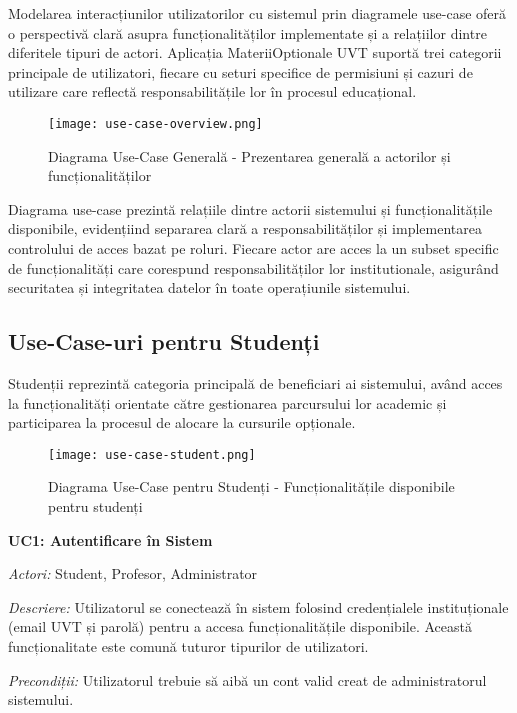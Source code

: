 \documentclass[12pt,a4paper]{report}
\begin{document}
Modelarea interacțiunilor utilizatorilor cu sistemul prin diagramele use-case oferă o perspectivă clară asupra funcționalităților implementate și a relațiilor dintre diferitele tipuri de actori. Aplicația MateriiOptionale UVT suportă trei categorii principale de utilizatori, fiecare cu seturi specifice de permisiuni și cazuri de utilizare care reflectă responsabilitățile lor în procesul educațional.

\begin{figure}[H]
\centering
\texttt{[image: use-case-overview.png]}
\caption{Diagrama Use-Case Generală - Prezentarea generală a actorilor și funcționalităților}
\label{fig:use-case-overview}
\end{figure}

Diagrama use-case prezintă relațiile dintre actorii sistemului și funcționalitățile disponibile, evidențiind separarea clară a responsabilităților și implementarea controlului de acces bazat pe roluri. Fiecare actor are acces la un subset specific de funcționalități care corespund responsabilităților lor institutionale, asigurând securitatea și integritatea datelor în toate operațiunile sistemului.

\subsection{Use-Case-uri pentru Studenți}

Studenții reprezintă categoria principală de beneficiari ai sistemului, având acces la funcționalități orientate către gestionarea parcursului lor academic și participarea la procesul de alocare la cursurile opționale.

\begin{figure}[H]
\centering
\texttt{[image: use-case-student.png]}
\caption{Diagrama Use-Case pentru Studenți - Funcționalitățile disponibile pentru studenți}
\label{fig:use-case-student}
\end{figure}

\textbf{UC1: Autentificare în Sistem}

\textit{Actori:} Student, Profesor, Administrator

\textit{Descriere:} Utilizatorul se conectează în sistem folosind credențialele instituționale (email UVT și parolă) pentru a accesa funcționalitățile disponibile. Această funcționalitate este comună tuturor tipurilor de utilizatori.

\textit{Precondiții:} Utilizatorul trebuie să aibă un cont valid creat de administratorul sistemului.
\end{document}
